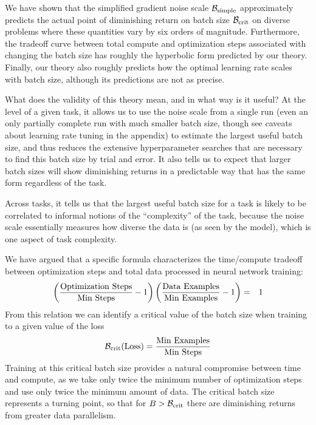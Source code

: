 \documentclass[english]{article}
\newcommand{\CB}{{\cal B}}
\begin{document}
\label{sec:Discussion}

We have shown that the simplified gradient noise scale $\mathcal{B}_{{\rm simple}}$ approximately predicts the actual point of diminishing return on batch size $\CB_{\rm crit}$ on diverse problems where these quantities vary by six orders of magnitude.  Furthermore, the tradeoff curve between total compute and optimization steps associated with changing the batch size has roughly the hyperbolic form predicted by our theory.  Finally, our theory also roughly predicts how the optimal learning rate scales with batch size, although its predictions are not  as precise.

What does the validity of this theory mean, and in what way is it useful?  At the level of a given task, it allows us to use the noise scale from a single run (even an only partially complete run with much smaller batch size, though see caveats about learning rate tuning in the appendix) to estimate the largest useful batch size, and thus reduces the extensive hyperparameter searches that are necessary to find this batch size by trial and error.  It also tells us to expect that larger batch sizes will show diminishing returns in a predictable way that has the same form regardless of the task.

Across tasks, it tells us that the largest useful batch size for a task is likely to be correlated to informal notions of the ``complexity'' of the task, because the noise scale essentially measures how diverse the data is (as seen by the model), which is one aspect of  task complexity.   

We have argued that a specific formula characterizes  the time/compute tradeoff between optimization steps and total data processed in neural network training:
\begin{eqnarray}
\left(\frac{{\rm Optimization\ Steps}}{{\rm Min\ Steps}}-1\right)\left(\frac{{\rm Data\ Examples}}{{\rm Min\ Examples}}-1\right) & = & 1\label{eq:TradeoffDiscussion}
\end{eqnarray}
From this relation we can identify a critical value of the batch size when training to a given value of the loss
\[
\mathcal{B}_{{\rm crit}}({\rm Loss})=\frac{\text{Min Examples}}{\text{Min Steps}}
\]
Training at this critical batch size provides a natural compromise between time and compute, as we take only twice the minimum number of optimization steps and use only twice the minimum amount of data.  The critical batch size represents a turning point, so that for $B > \CB_{\rm crit}$ there are diminishing returns from greater data parallelism.
\end{document}
